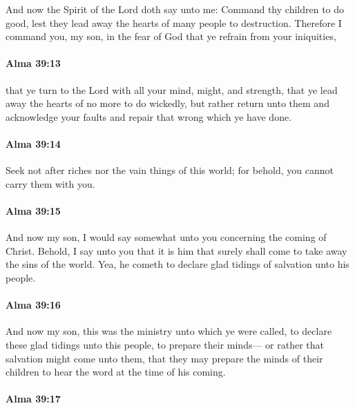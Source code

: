 			And now the Spirit of the Lord doth say unto me:
			Command thy children to do good,
			lest they lead away the hearts of many people to destruction.
			Therefore I command you, my son, in the fear of God
			that ye refrain from your iniquities,

		\paragraph{Alma 39:13} %
			\label{ALMA-39-13}

			that ye turn to the Lord with all your mind, might, and strength,
			that ye lead away the hearts of no more to do wickedly,
			but rather return unto them and acknowledge your faults
			and repair that wrong which ye have done.

		\paragraph{Alma 39:14} %
			\label{ALMA-39-14}

			Seek not after riches nor the vain things of this world;
			for behold, you cannot carry them with you.

		\paragraph{Alma 39:15} %
			\label{ALMA-39-15}

			And now my son, I would say somewhat unto you concerning the coming of Christ.
			Behold, I say unto you
			that it is him that surely shall come to take away the sins of the world.
			Yea, he cometh to declare glad tidings of salvation unto his people.

		\paragraph{Alma 39:16} %
			\label{ALMA-39-16}

			And now my son, this was the ministry unto which ye were called,
			to declare these glad tidings unto this people,
			to prepare their minds---
			or rather that salvation might come unto them,
			that they may prepare the minds of their children
			to hear the word at the time of his coming.

		\paragraph{Alma 39:17} %
			\label{ALMA-39-17}

